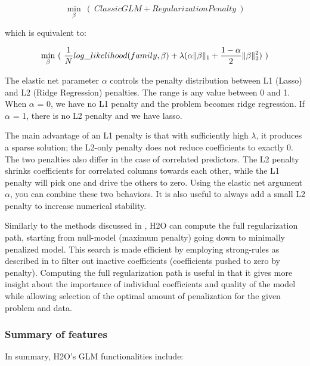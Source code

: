 \[ \min\limits_{\beta}\ (\ Classic GLM  + Regularization Penalty \ )\]

which is equivalent to:

\[ \min\limits_{\beta}\ (\ {{1\over{N}} log\_likelihood(family,\beta)  + \lambda (\alpha \| \beta \|_1} + {1- \alpha \over 2} \| \beta \|_2^2) \ )\]

\bigskip
The elastic net parameter $\alpha$ controls the penalty distribution between L1 (Lasso) and L2 (Ridge Regression) penalties. The range is any value between 0 and 1. When $\alpha$ = 0, we have no L1 penalty and the problem becomes ridge regression. If $\alpha$ = 1, there is no L2 penalty and we have lasso.

The main advantage of an L1 penalty is that with sufficiently high $\lambda$, it produces a sparse solution; the L2-only penalty does not reduce coefficients to exactly 0. The two penalties also differ in the case of correlated predictors. The L2 penalty shrinks coefficients for correlated columns towards each other, while the L1 penalty will pick one and drive the others to zero. Using the elastic net argument $\alpha$, you can combine these two behaviors. It is also useful to always add a small L2 penalty to increase numerical stability.

Similarly to the methods discussed in , H2O can compute the full regularization path, starting from null-model (maximum penalty) going down to minimally penalized model. This search is made efficient by employing strong-rules as described in  to filter out inactive coefficients (coefficients pushed to zero by penalty). Computing the full regularization path is useful in that it gives more insight about the importance of individual coefficients and quality of the model while allowing selection of the optimal amount of penalization for the given problem and data.

\subsubsection{Summary of features} 
In summary, H2O's GLM functionalities include:

